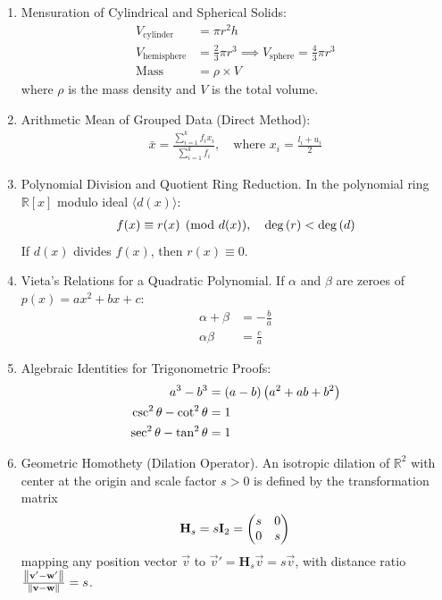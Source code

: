 \documentclass[12pt,a4paper]{article}
\begin{document}
\begin{enumerate}[label=\thesubsection.\arabic*, ref=\thesubsection.\theenumi]
	\item Mensuration of Cylindrical and Spherical Solids:
	\begin{align}
		V_{\text{cylinder}} &= \pi r^2 h \label{eq:CBSE10-2019-vol_cylinder} \\
		V_{\text{hemisphere}} &= \frac{2}{3}\pi r^3 \implies V_{\text{sphere}} = \frac{4}{3}\pi r^3 \label{eq:CBSE10-2019-vol_sphere} \\
		\text{Mass} &= \rho \times V \label{eq:CBSE10-2019-mass_density}
	\end{align}
	where $\rho$ is the mass density and $V$ is the total volume.
	
	\item Arithmetic Mean of Grouped Data (Direct Method):
	\begin{align}
		\bar{x} = \frac{\sum_{i=1}^k f_i x_i}{\sum_{i=1}^k f_i}, \quad \text{where } x_i = \frac{l_i + u_i}{2} \label{eq:CBSE10-2019-mean}
	\end{align}
	
	\item Polynomial Division and Quotient Ring Reduction.
	In the polynomial ring $\mathbb{R}[x]$ modulo ideal $\langle d(x) \rangle$:
	\begin{align}
		f(x) \equiv r(x) \pmod{d(x)}, \quad \deg\left(r\right) < \deg\left(d\right) \label{eq:CBSE10-2019-poly_mod}
	\end{align}
	If $d(x)$ divides $f(x)$, then $r(x) \equiv 0$.
	
	\item Vieta's Relations for a Quadratic Polynomial.
	If $\alpha$ and $\beta$ are zeroes of $p(x) = ax^2 + bx + c$:
	\begin{align}
		\alpha + \beta &= -\frac{b}{a} \label{eq:CBSE10-2019-vieta_sum} \\
		\alpha \beta &= \frac{c}{a} \label{eq:CBSE10-2019-vieta_prod}
	\end{align}
	
	\item Algebraic Identities for Trigonometric Proofs:
	\begin{align}
		a^3 - b^3 &= \left(a - b\right)\left(a^2 + ab + b^2\right) \label{eq:CBSE10-2019-cubic_diff} \\
		\csc^2\theta - \cot^2\theta &= 1 \label{eq:CBSE10-2019-csc_cot_id} \\
		\sec^2\theta - \tan^2\theta &= 1 \label{eq:CBSE10-2019-sec_tan_id}
	\end{align}
	
	\item Geometric Homothety (Dilation Operator).
	An isotropic dilation of $\mathbb{R}^2$ with center at the origin and scale factor $s > 0$ is defined by the transformation matrix
	\begin{align}
		\mathbf{H}_s = s\mathbf{I}_2 = \begin{pmatrix}s & 0 \\ 0 & s\end{pmatrix} \label{eq:CBSE10-2019-dilation}
	\end{align}
	mapping any position vector $\vec{v}$ to $\vec{v}' = \mathbf{H}_s \vec{v} = s\vec{v}$, with distance ratio $\frac{\left\lVert\mathbf{v}' - \mathbf{w}'\right\rVert}{\left\lVert\mathbf{v} - \mathbf{w}\right\rVert} = s$.
	
\end{enumerate}
	
\end{document}

